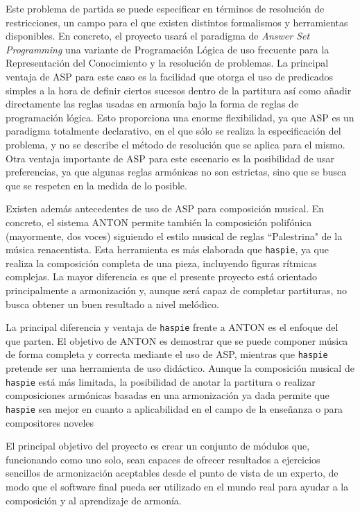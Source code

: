  Este problema de partida se puede especificar en términos de resolución de restricciones, un campo para el que existen distintos formalismos y herramientas disponibles. En concreto, el proyecto usará el paradigma de \textit{Answer Set Programming} una variante de Programación Lógica de uso frecuente para la Representación del Conocimiento y la resolución de problemas. La principal ventaja de ASP para este caso es la facilidad que otorga el uso de predicados simples a la hora de definir ciertos sucesos dentro de la partitura así como añadir directamente las reglas usadas en armonía bajo la forma de reglas de programación lógica. Esto proporciona una enorme flexibilidad, ya que ASP es un paradigma totalmente declarativo, en el que sólo se realiza la especificación del problema, y no se describe el método de resolución que se aplica para el mismo. Otra ventaja importante de ASP para este escenario es la posibilidad de usar preferencias, ya que algunas reglas armónicas no son estrictas, sino que se busca que se respeten en la medida de lo posible. 
 
 Existen además antecedentes de uso de ASP para composición musical. En concreto, el sistema ANTON\cite{anton-composing} permite también la composición polifónica (mayormente, dos voces) siguiendo el estilo musical de reglas ``Palestrina"\cite{palestrina-rules} de la música renacentista. Esta herramienta es más elaborada que \texttt{haspie}, ya que realiza la composición completa de una pieza, incluyendo figuras rítmicas complejas. La mayor diferencia es que el presente proyecto está orientado principalmente a armonización y, aunque será capaz de completar partituras, no busca obtener un buen resultado a nivel melódico.
 
 La principal diferencia y ventaja de \texttt{haspie} frente a ANTON es el enfoque del que parten. El objetivo de ANTON es demostrar que se puede componer música de forma completa y correcta mediante el uso de ASP, mientras que \texttt{haspie} pretende ser una herramienta de uso didáctico.
 Aunque la composición musical de \texttt{haspie} está más limitada, la posibilidad de anotar la partitura o realizar composiciones armónicas basadas en una armonización ya dada permite que \texttt{haspie} sea mejor en cuanto a aplicabilidad en el campo de la enseñanza o para compositores noveles
 
 El principal objetivo del proyecto es crear un conjunto de módulos que, funcionando como uno solo, sean capaces de ofrecer resultados a ejercicios sencillos de armonización aceptables desde el punto de vista de un experto, de modo que el software final pueda ser utilizado en el mundo real para ayudar a la composición y al aprendizaje de armonía.
 
